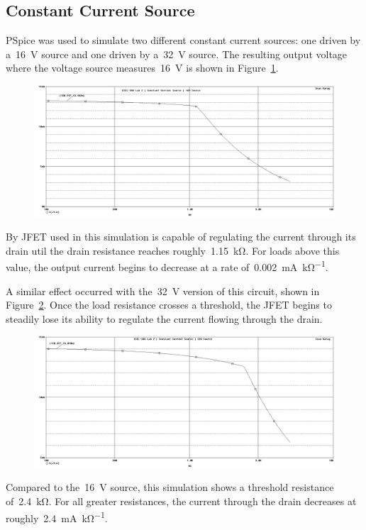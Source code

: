 \subsection{Constant Current Source}
PSpice was used to simulate two different constant current sources: one driven
by a~\SI{16}{\volt} source and one driven by a~\SI{32}{\volt} source.  The
resulting output voltage where the voltage source measures~\SI{16}{\volt} is
shown in Figure~\ref{fig:ccPlot16}.
%
\begin{figure}[H]
	\centering
	\includegraphics[width=\pwidth]{img/plot/constantCurrent16Plot.PNG}
	\parbox{\pwidth}{
	\caption{}
	\label{fig:ccPlot16}}
\end{figure}
%
By JFET used in this simulation is capable of regulating the current through
its drain util the drain resistance reaches roughly~\SI{1.15}{\kilo\ohm}.  For
loads above this value, the output current begins to decrease at a rate
of~\SI{0.002}{\milli\ampere\per\kilo\ohm}.

A similar effect occurred with the~\SI{32}{\volt} version of this circuit,
shown in Figure~\ref{fig:ccPlot32}.  Once the load resistance crosses a
threshold, the JFET begins to steadily lose its ability to regulate the current
flowing through the drain.
%
\begin{figure}[H]
	\centering
	\includegraphics[width=\pwidth]{img/plot/constantCurrent32Plot.PNG}
	\parbox{\pwidth}{
	\caption{}
	\label{fig:ccPlot32}}
\end{figure}
%
Compared to the~\SI{16}{\volt} source, this simulation shows a threshold
resistance of~\SI{2.4}{\kilo\ohm}.  For all greater resistances, the current
through the drain decreases at roughly~\SI{2.4}{\milli\ampere\per\kilo\ohm}.


